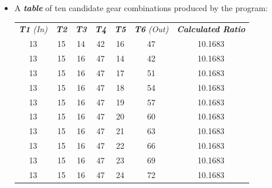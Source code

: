 \documentclass[12pt]{article}
\begin{document}
\begin{itemize}
    \item [(c)] A \textit{\textbf{table}} of ten candidate gear combinations produced by the program:

          \begin{table}[H]
              \centering
              \begin{tabular}{ccccccc}
                  \textit{\textbf{T1} (In)} & \textit{\textbf{T2}} & \textit{\textbf{T3}} & \textit{\textbf{T4}} & \textit{\textbf{T5}} & \textit{\textbf{T6} (Out)} & \textit{\textbf{Calculated Ratio}} \\
                  13                        & 15                   & 14                   & 42                   & 16                   & 47                         & 10.1683                            \\
                  13                        & 15                   & 16                   & 47                   & 14                   & 42                         & 10.1683                            \\
                  13                        & 15                   & 16                   & 47                   & 17                   & 51                         & 10.1683                            \\
                  13                        & 15                   & 16                   & 47                   & 18                   & 54                         & 10.1683                            \\
                  13                        & 15                   & 16                   & 47                   & 19                   & 57                         & 10.1683                            \\
                  13                        & 15                   & 16                   & 47                   & 20                   & 60                         & 10.1683                            \\
                  13                        & 15                   & 16                   & 47                   & 21                   & 63                         & 10.1683                            \\
                  13                        & 15                   & 16                   & 47                   & 22                   & 66                         & 10.1683                            \\
                  13                        & 15                   & 16                   & 47                   & 23                   & 69                         & 10.1683                            \\
                  13                        & 15                   & 16                   & 47                   & 24                   & 72                         & 10.1683                            \\
              \end{tabular}
          \end{table}


\end{itemize}
\end{document}
